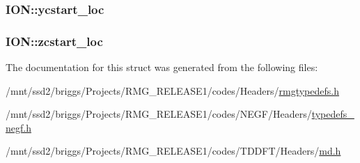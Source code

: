 \hypertarget{struct_i_o_n_a85bd80b0698b5d6d339ffff1c0863cd5}{
\subsubsection[{ycstart\-\_\-loc}]{ I\-O\-N\-::ycstart\-\_\-loc}}\label{struct_i_o_n_a85bd80b0698b5d6d339ffff1c0863cd5}
\hypertarget{struct_i_o_n_aac8c18b541ea01414cb7b6d8b57a2784}{
\subsubsection[{zcstart\-\_\-loc}]{ I\-O\-N\-::zcstart\-\_\-loc}}\label{struct_i_o_n_aac8c18b541ea01414cb7b6d8b57a2784}


The documentation for this struct was generated from the following files\-:\begin{DoxyCompactItemize}
\item 
/mnt/ssd2/briggs/\-Projects/\-R\-M\-G\-\_\-\-R\-E\-L\-E\-A\-S\-E1/codes/\-Headers/\hyperlink{rmgtypedefs_8h}{rmgtypedefs.\-h}\item 
/mnt/ssd2/briggs/\-Projects/\-R\-M\-G\-\_\-\-R\-E\-L\-E\-A\-S\-E1/codes/\-N\-E\-G\-F/\-Headers/\hyperlink{typedefs__negf_8h}{typedefs\-\_\-negf.\-h}\item 
/mnt/ssd2/briggs/\-Projects/\-R\-M\-G\-\_\-\-R\-E\-L\-E\-A\-S\-E1/codes/\-T\-D\-D\-F\-T/\-Headers/\hyperlink{md_8h}{md.\-h}\end{DoxyCompactItemize}
